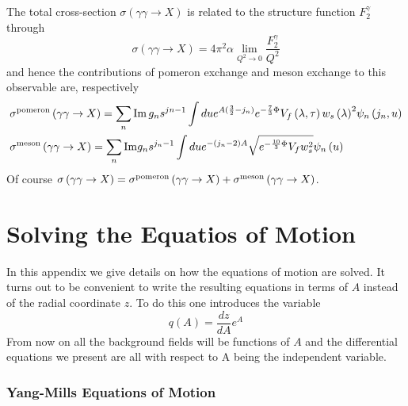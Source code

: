 \documentclass[a4paper,12pt]{article}
\begin{document}
The total cross-section $\sigma\left(\gamma \gamma \rightarrow X\right)$ is related to the structure function $F^\gamma_2$ through
\begin{equation}
\sigma\left(\gamma \gamma \rightarrow X\right) =  4 \pi^2 \alpha \lim_{Q^2 \rightarrow 0} \frac{F_2^\gamma}{Q^2}
\end{equation}
and hence the contributions of pomeron exchange and meson exchange to this observable are, respectively
\begin{align}
&\sigma^{\rm pomeron}\left(\gamma \gamma \rightarrow X\right) =  \sum_n {\rm Im} \, g_n s^{jn-1} \int du e^{A(\frac{3}{2} - j_n)}  e^{-\frac{7}{3} \Phi}  V_f \left( \lambda, \tau \right) {w_s\left(\lambda \right)}^2  \psi_n \left(j_n, u\right) \\ 
&\sigma^{\rm meson}\left(\gamma \gamma \rightarrow X\right) = \sum_n {\rm Im} g_n s^{j_n - 1} \int du e^{-\left(j_n - 2 \right)A }\sqrt{e^{-\frac{10}{3} \Phi} V_f w_s^2}  \psi_n\left(u\right)
\end{align}
Of course $\sigma\left(\gamma \gamma \rightarrow X\right) = \sigma^{\rm pomeron}\left(\gamma \gamma \rightarrow X\right) + \sigma^{\rm meson}\left(\gamma \gamma \rightarrow X\right)$.




\appendix

\section{Solving the Equatios of Motion}
\label{appendix:eom_sol}

In this appendix we give details on how the equations of motion are solved. It turns out to be convenient to write the resulting equations in terms of $A$ instead of the radial coordinate $z$. To do this one introduces the variable
\begin{equation}
q\left(A\right) = \frac{dz}{dA} e^{A}
\label{eq: q definition}
\end{equation}
From now on all the background fields will be functions of $A$ and the differential equations we present are all with respect to A being the independent variable.

\subsubsection*{Yang-Mills Equations of Motion}
\end{document}
